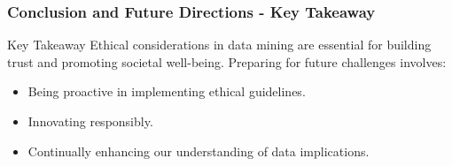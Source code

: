 \documentclass[aspectratio=169]{beamer}
\begin{document}
\begin{frame}[fragile]
    \frametitle{Conclusion and Future Directions - Key Takeaway}
    
    \begin{block}{Key Takeaway}
        Ethical considerations in data mining are essential for building trust and promoting societal well-being. Preparing for future challenges involves:
        \begin{itemize}
            \item Being proactive in implementing ethical guidelines.
            \item Innovating responsibly.
            \item Continually enhancing our understanding of data implications.
        \end{itemize}
    \end{block}
\end{frame}
\end{document}
